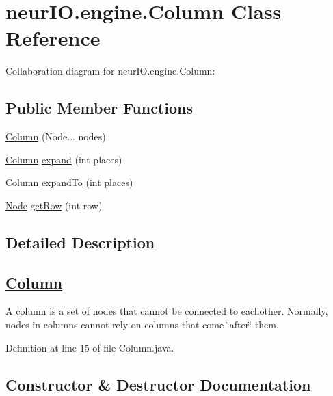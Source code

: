 \hypertarget{classneur_i_o_1_1engine_1_1_column}{}\section{neur\+I\+O.\+engine.\+Column Class Reference}
\label{classneur_i_o_1_1engine_1_1_column}


Collaboration diagram for neur\+I\+O.\+engine.\+Column\+:
\subsection*{Public Member Functions}
\begin{DoxyCompactItemize}
\item 
\hyperlink{classneur_i_o_1_1engine_1_1_column_a5c50cb359c8494adc1d3a240131ac6bd}{Column} (Node... nodes)
\item 
\hyperlink{classneur_i_o_1_1engine_1_1_column}{Column} \hyperlink{classneur_i_o_1_1engine_1_1_column_a19d03fcb7a397996c4b9e95bea1aad40}{expand} (int places)
\item 
\hyperlink{classneur_i_o_1_1engine_1_1_column}{Column} \hyperlink{classneur_i_o_1_1engine_1_1_column_a367f262a4bb1df7e2c1c911824b0fa45}{expand\+To} (int places)
\item 
\hyperlink{classneur_i_o_1_1system_1_1_node}{Node} \hyperlink{classneur_i_o_1_1engine_1_1_column_a7de8bbe0cd9eb4c051e8cb2cd94682c2}{get\+Row} (int row)
\end{DoxyCompactItemize}


\subsection{Detailed Description}
\subsection*{\hyperlink{classneur_i_o_1_1engine_1_1_column}{Column} }

A column is a set of nodes that cannot be connected to eachother. Normally, nodes in columns cannot rely on columns that come \char`\"{}after\char`\"{} them. 

Definition at line 15 of file Column.\+java.



\subsection{Constructor \& Destructor Documentation}
\mbox{\label{classneur_i_o_1_1engine_1_1_column_a5c50cb359c8494adc1d3a240131ac6bd}} 
